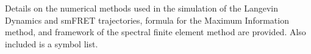 \documentclass[journal=jpcbfk,manuscript=article,layout=twocolumn,articletitle=true]{achemso}
\begin{document}
\begin{suppinfo}
Details on the numerical methods used in the simulation of the Langevin Dynamics and smFRET trajectories, formula for the Maximum Information method, and framework of the spectral finite element method are provided.  Also included is a symbol list.
\end{suppinfo}


\end{document}
